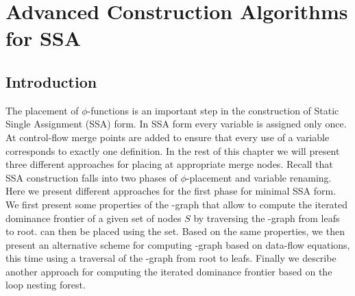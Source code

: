 \chapter{Advanced Construction Algorithms for SSA
   }
\label{chapter:alternative_ssa_construction_algorithms}

{

\def\p{$\phi$}
\def\st#1{\rlap{\raisebox{3.4pt}{\kern3pt{\scriptsize\it #1}}}{\rightarrow}}
\def\stplus{\rlap{\raisebox{3.4pt}{\kern3pt{\scriptsize+}}}{\rightarrow}}
\def\St#1{\rlap{\raisebox{3.4pt}{\kern3pt{\scriptsize\it #1}}}{\Rightarrow}}
\def\depth{\textrm{depth}}
\newcommand\subtree[1]{\textsf{subtree}(#1)}

\def\p{$\phi$}
\def\iDFfwd{\iDF\!\!_{\textit{fwd}}}


\section{Introduction}

The placement of $\phi$-functions is an important step in the construction of Static Single Assignment (SSA) form. 
In SSA form every variable is assigned only once. 
At control-flow merge points \phifuns are added to ensure that every use of a variable corresponds to exactly one definition. 
In the rest of this chapter we will present three different approaches for placing \phifuns at appropriate merge nodes. 
Recall that SSA construction falls into two phases of $\phi$-placement and variable renaming. 
Here we present different approaches for the first phase for minimal SSA form.  
We first present some properties of the \DJ-graph 
that allow to compute the iterated dominance frontier of a given set of nodes 
$S$ by traversing the \DJ-graph from leafs to root.  \phifuns can then be 
placed using the \iDF set.
Based on the same properties, we then present an alternative scheme for computing \iDF-graph based on data-flow equations, this time using a traversal of the \DJ-graph from root to leafs. 
Finally we describe another approach for computing the iterated dominance frontier based on the loop nesting forest.



}
